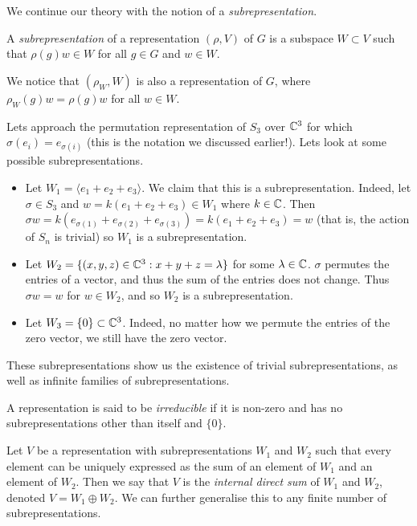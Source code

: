 We continue our theory with the notion of a \emph{subrepresentation}.

\begin{definition}
  A \emph{subrepresentation} of a representation $(\rho, V)$ of $G$ is a subspace $W \subset V$ such that $\rho(g)w \in W$ for all $g \in G$ and $w \in W$.
\end{definition}

We notice that $(\rho_W, W)$ is also a representation of $G$, where $\rho_W(g)w = \rho(g)w$ for all $w \in W$.

\begin{example}
  Lets approach the permutation representation of $S_3$ over $\mathbb{C}^3$ for which $\sigma(e_i) = e_{\sigma(i)}$ (this is the notation we discussed earlier!). Lets look at some possible subrepresentations.
  \begin{itemize}
    \item Let $W_1 = \langle e_1 + e_2 + e_3 \rangle$. We claim that this is a subrepresentation. Indeed, let $\sigma \in S_3$ and $w = k(e_1 + e_2 + e_3) \in W_1$ where $k \in \mathbb{C}$. Then $\sigma w = k(e_{\sigma(1)} + e_{\sigma(2)} + e_{\sigma(3)}) = k(e_1 + e_2 + e_3) = w$ (that is, the action of $S_n$ is trivial) so $W_1$ is a subrepresentation.
    \item Let $W_2 = \{ (x,y,z) \in \mathbb{C}^3: x + y + z = \lambda \}$ for some $\lambda \in \mathbb{C}$. $\sigma$ permutes the entries of a vector, and thus the sum of the entries does not change. Thus $\sigma w = w$ for $w \in W_2$, and so $W_2$ is a subrepresentation.
    \item Let $W_3 = \{0\} \subset \mathbb{C}^3$. Indeed, no matter how we permute the entries of the zero vector, we still have the zero vector.
  \end{itemize}
  These subrepresentations show us the existence of trivial subrepresentations, as well as infinite families of subrepresentations.
\end{example}

\begin{definition}
  A representation is said to be \emph{irreducible} if it is non-zero and has no subrepresentations other than itself and $\{0\}$.
\end{definition}

Let $V$ be a representation with subrepresentations $W_1$ and $W_2$ such that every element can be uniquely expressed as the sum of an element of $W_1$ and an element of $W_2$. Then we say that $V$ is the \emph{internal direct sum} of $W_1$ and $W_2$, denoted $V = W_1 \oplus W_2$. We can further generalise this to any finite number of subrepresentations.

